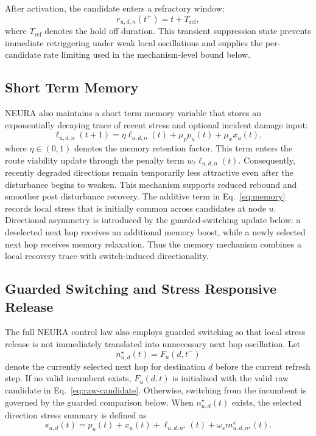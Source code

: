 \documentclass[5p,times]{elsarticle}
\begin{document}
After activation, the candidate enters a refractory window:
\begin{equation}\label{eq:refractory-update}
r_{u,d,n}(t^+) = t + T_{\mathrm{ref}},
\end{equation}
where $T_{\mathrm{ref}}$ denotes the hold off duration. This transient suppression state prevents immediate retriggering under weak local oscillations and supplies the per-candidate rate limiting used in the mechanism-level bound below.

\subsection{Short Term Memory}

NEURA also maintains a short term memory variable that stores an exponentially decaying trace of recent stress and optional incident damage input:
\begin{equation}\label{eq:memory}
\ell_{u,d,n}(t+1) =
\eta \ell_{u,d,n}(t) + \mu_p p_u(t) + \mu_x x_u(t),
\end{equation}
where $\eta \in (0,1)$ denotes the memory retention factor. This term enters the route viability update through the penalty term $w_\ell \ell_{u,d,n}(t)$. Consequently, recently degraded directions remain temporarily less attractive even after the disturbance begins to weaken. This mechanism supports reduced rebound and smoother post disturbance recovery.
The additive term in Eq.~\eqref{eq:memory} records local stress that is initially common across candidates at node $u$. Directional asymmetry is introduced by the guarded-switching update below: a deselected next hop receives an additional memory boost, while a newly selected next hop receives memory relaxation. Thus the memory mechanism combines a local recovery trace with switch-induced directionality.

\subsection{Guarded Switching and Stress Responsive Release}
\label{sec:guarded-switching}

The full NEURA control law also employs guarded switching so that local stress release is not immediately translated into unnecessary next hop oscillation. Let
\begin{equation}
n^\star_{u,d}(t)=F_u(d,t^-)
\end{equation}
denote the currently selected next hop for destination $d$ before the current refresh step. If no valid incumbent exists, $F_u(d,t)$ is initialized with the valid raw candidate in Eq.~\eqref{eq:raw-candidate}. Otherwise, switching from the incumbent is governed by the guarded comparison below. When $n^\star_{u,d}(t)$ exists, the selected direction stress summary is defined as
\begin{equation}\label{eq:selected-stress}
s_{u,d}(t)=p_u(t)+x_u(t)+\ell_{u,d,n^\star}(t)+\omega_s m^s_{u,d,n^\star}(t).
\end{equation}
\end{document}
